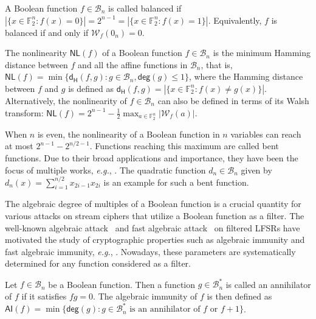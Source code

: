 \documentclass[runningheads,orivec]{llncs}
\newcommand{\AI}{\mathsf{AI}}
\newcommand{\BN}{\mathcal{B}_n}
\newcommand{\degg}{\mathsf{deg}}
\newcommand{\eg}{\textit{e.g.}}
\newcommand{\F}{\mathbb{F}}
\newcommand{\hd}{\mathsf{d_H}}
\newcommand{\NL}{\mathsf{NL}}
\newcommand{\wt}[1]{\mathcal W_{#1}}
\let\leq=\leqslant
\begin{document}
    \begin{definition}[Balancedness]
    	A Boolean function $f\in\BN$ is called balanced if $|\{x \in \F_2^n : f(x)=0\}|=2^{n-1}=|\{x \in \F_2^n : f(x)=1\}|$. Equivalently, $f$ is balanced if and only if $\wt f(0_n)=0$.
    \end{definition}
    
    \begin{definition}[Nonlinearity, \eg, page 79 in \cite{Carlet20}]
    	\label{def:nl}
    	The nonlinearity $\NL(f)$ of a Boolean function $f\in \BN$ is the minimum Hamming distance between $f$ and all the affine functions in $\BN$, that is, $\NL(f) = \min\{ \hd(f,g):g\in\BN,\degg(g)\leq 1\}$, where the Hamming distance between $f$ and $g$ is defined as $\hd(f,g)=|\{x\in\F_2^n:f(x)\neq g(x)\}|$. Alternatively, the nonlinearity of $f\in\BN$ can also be defined in terms of its Walsh transform: $\NL(f) = 2^{n-1}- \frac{1}{2} \max_{a\in \F_2^n}{|\wt{f}(a)|}$.
    \end{definition}
    
    When $n$ is even, the nonlinearity of a Boolean function in $n$ variables can reach at most $2^{n-1}-2^{n/2 -1}$. Functions reaching this maximum are called bent functions. Due to their broad applications and importance, they have been the focus of multiple works, \eg, \cite{Rothaus76,FSE:Dobbertin95,DBLP:conf/itw/BudaghyanCH11,Tokareva15,Mesnager16}.  The quadratic function $d_n\in\BN$ given by $d_n(x)=\sum_{i=1}^{n/2}x_{2i-1}x_{2i}$ is an example for such a bent function.
    
    \bigskip
    
    The algebraic degree of multiples of a Boolean function is a crucial quantity for various attacks on stream ciphers that utilize a Boolean function as a filter.  The well-known algebraic attack~\cite{EC:CouMei03} and fast algebraic attack~\cite{C:Courtois03} on filtered \textsf{LFSR}s have motivated the study of cryptographic properties such as algebraic immunity and fast algebraic immunity, \eg, \cite{FSE:Armknecht04,C:HawRos04,ISC:JiaZhaWan13}. Nowadays, these parameters are systematically determined for any function considered as a filter.
    
    \begin{definition} \label{def:ai}
    	Let $f\in\BN$ be a Boolean function. Then a function $g\in\BN^*$ is called an annihilator of $f$ if it satisfies $fg=0$. The algebraic immunity of $f$ is then defined as $\AI(f) = \min\{ \degg(g):\text{$g\in\BN^*$ is an annihilator of $f$ or $f+1$}\}$.
    \end{definition}
    
\end{document}
